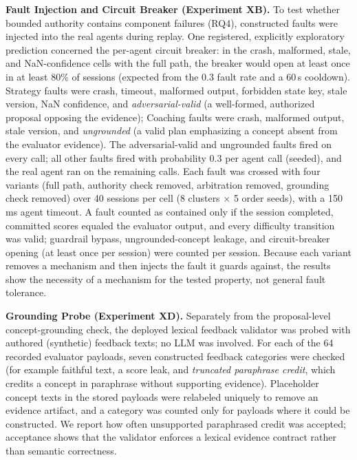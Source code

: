 \noindent\textbf{Fault Injection and Circuit Breaker (Experiment XB).}
To test whether bounded authority contains component failures (RQ4), constructed faults were injected into the real agents during replay. One registered, explicitly exploratory prediction concerned the per-agent circuit breaker: in the crash, malformed, stale, and NaN-confidence cells with the full path, the breaker would open at least once in at least 80\% of sessions (expected from the 0.3 fault rate and a 60\,s cooldown). Strategy faults were crash, timeout, malformed output, forbidden state key, stale version, NaN confidence, and \emph{adversarial-valid} (a well-formed, authorized proposal opposing the evidence); Coaching faults were crash, malformed output, stale version, and \emph{ungrounded} (a valid plan emphasizing a concept absent from the evaluator evidence). The adversarial-valid and ungrounded faults fired on every call; all other faults fired with probability 0.3 per agent call (seeded), and the real agent ran on the remaining calls. Each fault was crossed with four variants (full path, authority check removed, arbitration removed, grounding check removed) over 40 sessions per cell (8 clusters $\times$ 5 order seeds), with a 150\,ms agent timeout. A fault counted as contained only if the session completed, committed scores equaled the evaluator output, and every difficulty transition was valid; guardrail bypass, ungrounded-concept leakage, and circuit-breaker opening (at least once per session) were counted per session. Because each variant removes a mechanism and then injects the fault it guards against, the results show the necessity of a mechanism for the tested property, not general fault tolerance.

\noindent\textbf{Grounding Probe (Experiment XD).}
Separately from the proposal-level concept-grounding check, the deployed lexical feedback validator was probed with authored (synthetic) feedback texts; no LLM was involved. For each of the 64 recorded evaluator payloads, seven constructed feedback categories were checked (for example faithful text, a score leak, and \emph{truncated paraphrase credit}, which credits a concept in paraphrase without supporting evidence). Placeholder concept texts in the stored payloads were relabeled uniquely to remove an evidence artifact, and a category was counted only for payloads where it could be constructed. We report how often unsupported paraphrased credit was accepted; acceptance shows that the validator enforces a lexical evidence contract rather than semantic correctness.

